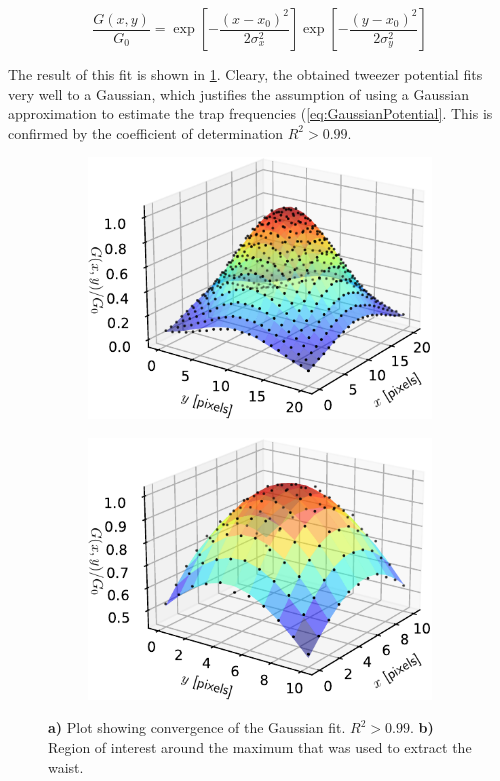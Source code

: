 \begin{equation}\label{eq:2DGaussian}
    \frac{G(x,y)}{G_0} =  
    \exp{\left[ -\frac{(x-x_0)^2}{2\sigma_x^2}\right]}
    \exp{\left[ -\frac{(y-x_0)^2}{2\sigma_y^2}\right]}
\end{equation}

The result of this fit is shown in \cref{fig:3Dshowing}. 
Cleary, the obtained tweezer potential fits very well to a Gaussian, which justifies the assumption of using a Gaussian approximation to estimate the trap frequencies (\cref{eq:GaussianPotential}. 
This is confirmed by the coefficient of determination $R^2 > 0.99$.

\begin{figure}
\centering
	\begin{subfigure}{.49\textwidth}
	    \centering
		\includegraphics[width=0.96\linewidth]{figures/3DSpotFitGaussian.pdf}
		\caption{}
		\label{fig:3Dshowing}
	\end{subfigure}
	\begin{subfigure}{.49\textwidth}
		\centering
		\includegraphics[width=0.96\linewidth]{figures/3DSpotFitGaussianSmaller.pdf}
		\caption{}
		\label{fig:3Dwaistfit}
	\end{subfigure}
	\caption{\textbf{a)} Plot showing convergence of the Gaussian fit. $R^2 > 0.99$.
	\textbf{ b)} Region of interest around the maximum that was used to extract the waist.}
	\label{fig:3Dfits}
\end{figure}

